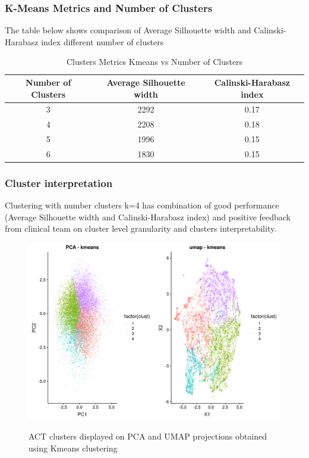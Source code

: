 \documentclass{article}
\begin{document}
\subsubsection{K-Means Metrics and Number of Clusters}
The table below shows comparison of Average Silhouette width and Calinski-Harabasz index different number of clusters

\begin{table}[H]
  \caption{Clusters Metrics Kmeans vs Number of Clusters}
  \label{steps_metrics}
  \centering
  \begin{tabular}{ c|c|c}
    \toprule
    \cmidrule(r){1-2}
    Number of Clusters & Average Silhouette width & Calinski-Harabasz index \\
    \midrule
    3 & 2292 & 0.17 \\
    4 & 2208 & 0.18 \\
    5 & 1996 & 0.15 \\
    6 & 1830 & 0.15 \\
    \bottomrule
    \end{tabular}
\end{table}

\subsubsection{Cluster interpretation}
Clustering with number clusters k=4 has combination of good performance (Average Silhouette width and Calinski-Harabasz index) and positive feedback from clinical team on cluster level granularity and clusters interpretability. 

\begin{figure}
  \centering
  \caption{ACT clusters displayed on PCA and UMAP projections obtained using Kmeans clustering}
  \includegraphics[scale=0.5]{fig_ACT_4_clusters.png}
  \label{fig:figACT4clusters}
\end{figure}
\end{document}
